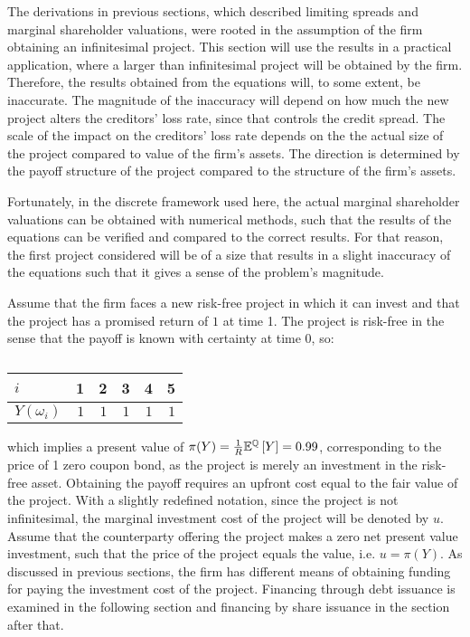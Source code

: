 \documentclass[main.tex]{subfiles}
\begin{document}
    The derivations in previous sections, 
    which described limiting spreads and marginal shareholder valuations, 
    were rooted in the assumption of the firm obtaining an infinitesimal project.
    This section will use the results in a practical application,
    where a larger than infinitesimal project will be obtained by the firm.
    Therefore, the results obtained from the equations will, to some extent, be inaccurate.
    The magnitude of the inaccuracy will depend on how much the new project alters
    the creditors' loss rate, since that controls the credit spread.
    The scale of the impact on the creditors' loss rate 
    depends on the the actual size of the project compared to value of the firm's assets.
    The direction is determined by the payoff structure of the project
    compared to the structure of the firm's assets.

    Fortunately, in the discrete framework used here, 
    the actual marginal shareholder valuations can be obtained with numerical methods,
    such that the results of the equations can be verified and compared to the correct results.
    For that reason, the first project considered will be of a size that
    results in a slight inaccuracy of the equations such that
    it gives a sense of the problem's magnitude.
    
    Assume that the firm faces a new risk-free project in which it can invest
    and that the project has a promised return of $\num{1}$ at time 1.
    The project is risk-free in the sense that the payoff is known with certainty at time 0, so:
        \begin{table}[H]
            \centering
            \begin{tabular}{l|rrrrr}
                $i$ & 1 & 2 & 3 & 4 & 5 \\
                \hline
                $Y(\omega_{i})$ & $\num{1}$ & $\num{1}$ & $\num{1}$ & $\num{1}$ & $\num{1}$
            \end{tabular}
            \caption{}
            \label{tbl:single-period-simple-derivative-payoff}
        \end{table}
    which implies a present value of 
    $\pi(Y) = \frac{1}{R} \mathbb{E}^{\mathbb{Q}}\left[Y\right] = \num{0.99}$, 
    corresponding to the price of 1 zero coupon bond, 
    as the project is merely an investment in the risk-free asset.
    Obtaining the payoff requires an upfront cost equal to the fair value of the project.
    With a slightly redefined notation, since the project is not infinitesimal,
    the marginal investment cost of the project will be denoted by $u$.
    Assume that the counterparty offering the project makes a zero net present value investment, 
    such that the price of the project equals the value, i.e. $u = \pi(Y)$.
    As discussed in previous sections, the firm has different means of obtaining funding
    for paying the investment cost of the project.
    Financing through debt issuance is examined in the following section 
    and financing by share issuance in the section after that.
\end{document}
